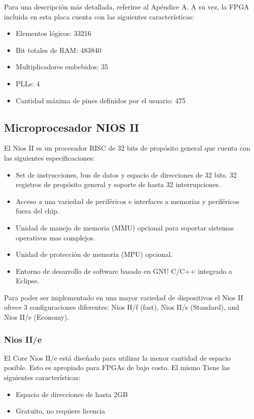 Para una descripción más detallada, referirse al Apéndice A. A su vez, la FPGA incluida en esta placa cuenta con las siguientes características:

\begin{itemize}
	\item Elementos lógicos: 33216
	\item Bit totales de RAM: 483840
	\item Multiplicadores embebidos: 35
	\item PLLs: 4
	\item Cantidad máxima de pines definidos por el usuario: 475
\end{itemize}


\subsection{Microprocesador NIOS II}
El Nios II es un procesador RISC de 32 bits de propósito general que cuenta con las siguientes especificaciones:
\begin{itemize}
	\item Set de instrucciones, bus de datos y espacio de direcciones de 32 bits. 32 registros de propósito general y soporte de hasta 32 interrupciones.
	\item Acceso a una variedad de periféricos e interfaces a memorias y periféricos fuera del chip.
	\item Unidad de manejo de memoria (MMU) opcional para soportar sistemas operativos mas complejos.
	\item Unidad de protección de memoria (MPU) opcional.
	\item Entorno de desarrollo de software basado en GNU C/C++ integrado a Eclipse.
\end{itemize}

Para poder ser implementado en una mayor variedad de dispositivos el Nios II ofrece 3 configuraciones diferentes:  Nios II/f (fast), Nios II/s (Standard), and Nios II/e (Economy).

\subsubsection{Nios II/e}
El Core Nios II/e está diseñado para utilizar la menor cantidad de espacio posible. Esto es apropiado para FPGAs de bajo costo. El mismo Tiene las siguientes características:
\begin{itemize}
	\item Espacio de direcciones de hasta 2GB
	\item Gratuito, no requiere licencia 
\end{itemize}

